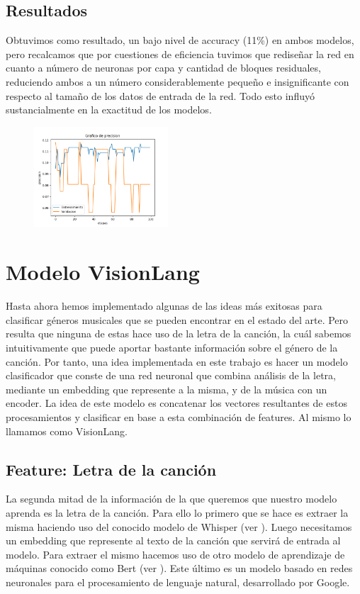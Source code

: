 \documentclass[colorinlistoftodos,twoside,twocolumn,10pt]{article} %
\begin{document}
\subsection*{Resultados}
Obtuvimos como resultado, un bajo nivel de accuracy (11\%) en ambos modelos, pero recalcamos que por cuestiones de eficiencia tuvimos que redise\~nar la red en cuanto a n\'umero de neuronas por capa y cantidad de bloques residuales, reduciendo ambos a un n\'umero considerablemente peque\~no e insignificante con respecto al  tama\~no de los datos de entrada de la red. Todo esto influy\'o sustancialmente en la exactitud de los modelos. 
\begin{figure}[h!]
	\includegraphics[width=5cm]{Conv1D_accuracy.png}
\end{figure}

\section{Modelo VisionLang}

Hasta ahora hemos implementado algunas de las ideas m\'as exitosas para clasificar g\'eneros musicales que se pueden encontrar en el estado del arte. Pero resulta que ninguna de estas hace uso de la letra de la canci\'on, la cu\'al sabemos intuitivamente que puede aportar bastante informaci\'on sobre el g\'enero de la canci\'on. Por tanto, una idea implementada en este trabajo es hacer un modelo clasificador que conste de una red neuronal que combina an\'alisis de la letra, mediante un embedding que represente a la misma, y de la m\'usica con un encoder. La idea de este modelo es concatenar los vectores resultantes de estos procesamientos y clasificar en base a esta combinaci\'on de features. Al mismo lo llamamos como VisionLang.

\subsection{Feature: Letra de la canci\'on}

La segunda mitad de la informaci\'on de la que queremos que nuestro modelo aprenda es la letra de la canci\'on. Para ello lo primero que se hace es extraer la misma haciendo uso del conocido modelo de Whisper (ver \cite{whisper}). Luego necesitamos un embedding que represente al texto de la canci\'on que servir\'a de entrada al modelo. Para extraer el mismo hacemos uso de otro modelo de aprendizaje de m\'aquinas conocido como Bert (ver \cite{bert}). Este \'ultimo es un modelo basado en redes neuronales para el procesamiento de lenguaje natural, desarrollado por Google.
\end{document}

